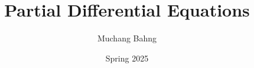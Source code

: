 \documentclass{article}
\begin{document}
\title{Partial Differential Equations}
\author{Muchang Bahng}
\date{Spring 2025}

\maketitle
\tableofcontents
\pagebreak
\end{document}
